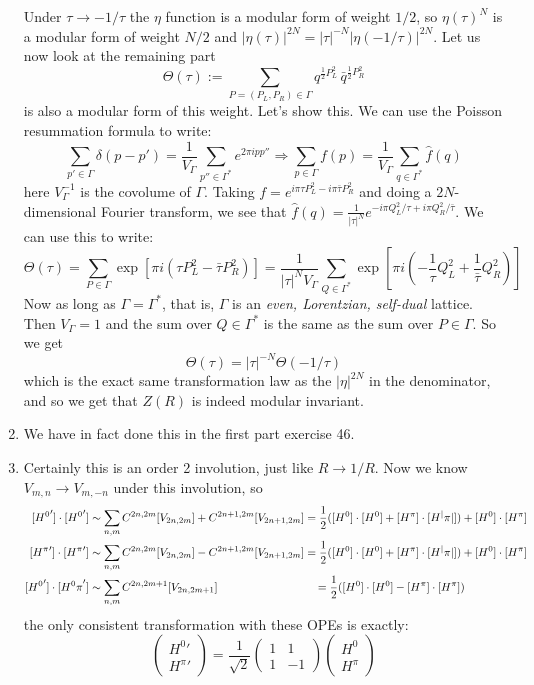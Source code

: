 \documentclass[11pt]{article}
\begin{document}
\begin{enumerate}
	Under $\tau \to -1/\tau$ the $\eta$ function is a modular form of weight $1/2$, so $\eta(\tau)^N$ is a modular form of weight $N/2$ and $|\eta(\tau)|^{2N} = |\tau|^{-N} |\eta(-1/\tau)|^{2N}$. Let us now look at the remaining part
	\[
		\Theta(\tau) := \sum_{P = (P_L, P_R) \in \Gamma} q^{\frac12 P_L^2}\, \bar q^{\frac12 P_R^2}
	\]
	is also a modular form of this weight. Let's show this. We can use the Poisson resummation formula to write:
	\[
		\sum_{p' \in \Gamma} \delta(p - p') = \frac{1}{V_\Gamma} \sum_{p'' \in \Gamma^*} e^{2\pi i p p''}  \Rightarrow \sum_{p \in \Gamma} f(p) = \frac{1}{V_\Gamma} \sum_{q \in \Gamma^*} \hat f(q)
	\]
	here $V^{-1}_{\Gamma}$ is the covolume of $\Gamma$. Taking $f = e^{i \pi \tau P_L^2 - i \pi \bar \tau P_R^2}$ and doing a $2N$-dimensional Fourier transform, we see that $\hat f(q) = \frac{1}{|\tau|^N} e^{-i \pi Q_L^2/\tau + i \pi Q_R^2/\bar \tau} $.
	We can use this to write:
	\[
		\Theta(\tau) = \sum_{P \in \Gamma} \exp\left[ \pi i (\tau P_L^2 - \bar \tau P_R^2) \right] = \frac{1}{|\tau|^N V_\Gamma} \sum_{Q \in \Gamma^*} \exp\left[ \pi i (-\frac{1}{\tau} Q_L^2 + \frac{1}{\bar \tau} Q_R^2) \right]
	\]
	Now as long as $\Gamma = \Gamma^*$, that is, $\Gamma$ is an \emph{even, Lorentzian, self-dual} lattice. Then $V_{\Gamma} = 1$ and the sum over $Q \in \Gamma^*$ is the same as the sum over $P \in \Gamma$. So we get
	\[
		\Theta(\tau) = |\tau|^{-N} \Theta(-1/\tau)
	\]
	which is the exact same transformation law as the $|\eta|^{2N}$ in the denominator, and so we get that $Z(R)$ is indeed modular invariant. 
			
	\item We have in fact done this in the first part exercise 46. 
	
	\item Certainly this is an order 2 involution, just like $R \to 1/R$. Now we know $V_{m,n} \to V_{m, -n}$ under this involution, so
	\[
	\begin{aligned}
		[{H^0}'] \cdot [{H^0}'] &\sim \sum_{n,m} C^{2n, 2m} [V_{2n, 2m}] + C^{2n+1, 2m} [V_{2n+1, 2m}] = \frac12 ([H^0] \cdot [H^0] + [H^\pi] \cdot [H^|\pi|]) + [H^0] \cdot [H^\pi] \\
		[{H^\pi}'] \cdot [{H^\pi}'] &\sim \sum_{n,m} C^{2n, 2m} [V_{2n, 2m}] - C^{2n+1, 2m} [V_{2n+1, 2m}] = \frac12 ([H^0] \cdot [H^0] + [H^\pi] \cdot [H^|\pi|]) + [H^0] \cdot [H^\pi] \\
		[{H^0}'] \cdot [{H^0\pi}'] &\sim \sum_{n,m} C^{2n, 2m+1} [V_{2n, 2m+1}] \hspace{1.2in}= \frac12 ([H^0] \cdot [H^0] - [H^\pi] \cdot [H^\pi])
	\end{aligned}
	\]
	the only consistent transformation with these OPEs is exactly:
	\[
		\begin{pmatrix}
			{H^0}'\\
			{H^\pi}'
		\end{pmatrix}
		= \frac{1}{\sqrt 2} \begin{pmatrix}
			1 & 1\\
			1 & -1
		\end{pmatrix}
		\begin{pmatrix}
			H^0\\
			H^\pi
		\end{pmatrix}
	\]
	

\end{enumerate}
\end{document}
